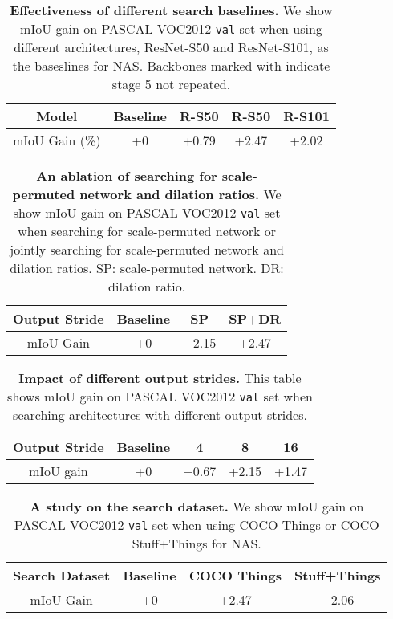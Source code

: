 \documentclass[10pt,twocolumn,letterpaper]{article}
\begin{document}
\setlength{\tabcolsep}{4pt}
\begin{table}[h!]
\centering
\begin{tabular}{c| c | ccc }
  \toprule
  Model &  Baseline & R-S50 & R-S50 & R-S101  \\
  \midrule
  mIoU Gain (\%) & +0 & +0.79 & +2.47 & +2.02\\
  \bottomrule
\end{tabular}
\caption{\textbf{Effectiveness of different search baselines.} We show mIoU gain on PASCAL VOC2012 \texttt{val} set when using different architectures, ResNet-S50 and ResNet-S101, as the baseslines for NAS. Backbones marked with  indicate stage 5 not repeated.}
\label{tab:search_models} 
\end{table}
\setlength{\tabcolsep}{4pt}
\begin{table}[h!]
\centering
\begin{tabular}{c| c |c c}
  \toprule
  Output Stride & Baseline & SP & SP+DR  \\
  \midrule
  mIoU Gain & +0 & +2.15 & +2.47 \\
  \bottomrule
\end{tabular}
\caption{\textbf{An ablation of searching for scale-permuted network and dilation ratios.} We show mIoU gain on PASCAL VOC2012 \texttt{val} set when searching for scale-permuted network or jointly searching for scale-permuted network and dilation ratios. SP: scale-permuted network. DR: dilation ratio.}
\label{tab:search_perm_dils} 
\end{table}
\setlength{\tabcolsep}{4pt}
\begin{table}[h!]
\centering
\begin{tabular}{c| c |c c c}
  \toprule
  Output Stride & Baseline & 4 & 8 & 16  \\
  \midrule
  mIoU gain & +0 & +0.67 & +2.15 & +1.47 \\
  \bottomrule
\end{tabular}
\caption{\textbf{Impact of different output strides.} This table shows mIoU gain on PASCAL VOC2012 \texttt{val} set when searching architectures with different output strides.}
\label{tab:search_os} 
\end{table}
\setlength{\tabcolsep}{4pt}
\begin{table}[h!]
\centering
\begin{tabular}{c| c |c c}
  \toprule
  Search Dataset & Baseline & COCO Things & Stuff+Things  \\
  \midrule
  mIoU Gain & +0 & +2.47 & +2.06 \\
  \bottomrule
\end{tabular}
\caption{\textbf{A study on the search dataset.} We show mIoU gain on PASCAL VOC2012 \texttt{val} set when using COCO Things or COCO Stuff+Things for NAS.}
\label{tab:search_coco} 
\end{table}
\end{document}
